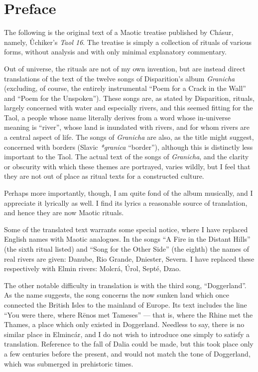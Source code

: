 \documentclass{article}
\begin{document}
\color{DarkGreen}

\section*{Preface}

The following is the original text of a Maotic treatise published by Chásur, namely, Ûchiker's \emph{Taol 16}. The treatise is simply a collection of rituals of various forms, without analysis and with only minimal explanatory commentary.

Out of universe, the rituals are not of my own invention, but are instead direct translations of the text of the twelve songs of Disparition's album \emph{Granicha} (excluding, of course, the entirely instrumental ``Poem for a Crack in the Wall'' and ``Poem for the Unspoken''). These songs are, as stated by Disparition, rituals, largely concerned with water and especially rivers, and this seemed fitting for the Taol, a people whose name literally derives from a word whose in-universe meaning is ``river'', whose land is inundated with rivers, and for whom rivers are a central aspect of life. The songs of \emph{Granicha} are also, as the title might suggest, concerned with borders (Slavic \textit{*granica} ``border''), although this is distinctly less important to the Taol. The actual text of the songs of \emph{Granicha}, and the clarity or obscurity with which these themes are portrayed, varies wildly, but I feel that they are not out of place as ritual texts for a constructed culture.

Perhaps more importantly, though, I am quite fond of the album musically, and I appreciate it lyrically as well. I find its lyrics a reasonable source of translation, and hence they are now Maotic rituals.

Some of the translated text warrants some special notice, where I have replaced English names with Maotic analogues. In the songs ``A Fire in the Distant Hills'' (the sixth ritual listed) and ``Song for the Other Side'' (the eighth) the names of real rivers are given: Danube, Rio Grande, Dniester, Severn. I have replaced these respectively with Elmin rivers: Molcrá, Úrol, Septé, Dzao.

The other notable difficulty in translation is with the third song, ``Doggerland''. As the name suggests, the song concerns the now sunken land which once connected the British Isles to the mainland of Europe. Its text includes the line ``You were there, where R\={e}nos met Tameses'' — that is, where the Rhine met the Thames, a place which only existed in Doggerland. Needless to say, there is no similar place in Elmincár, and I do not wish to introduce one simply to satisfy a translation. Reference to the fall of Dalia could be made, but this took place only a few centuries before the present, and would not match the tone of Doggerland, which was submerged in prehistoric times.
\end{document}
